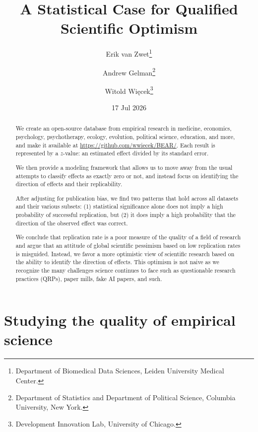 \documentclass[11pt]{article}
\begin{document}
\sloppy

\title{\bf A Statistical Case for Qualified Scientific Optimism\vspace{.1in}}

\author{
Erik van Zwet\thanks{Department of Biomedical Data Sciences, Leiden University Medical Center.}
\and Andrew Gelman\thanks{Department of Statistics and Department of Political Science, Columbia University, New York.}
\and Witold Wi\k{e}cek\thanks{Development Innovation Lab, University of Chicago.}
\vspace{.1in}
}

\date{17 Jul 2026}

\maketitle

\begin{abstract}

We create an open-source database from empirical research in medicine, economics, psychology, psychotherapy, ecology, evolution, political science, education, and more, and make it available at \url{https://github.com/wwiecek/BEAR/}. Each result is represented by a $z$-value: an estimated effect divided by its standard error.

We then provide a modeling framework that allows us to move away from the usual attempts to classify effects as exactly zero or not, and instead focus on identifying the direction of effects and their replicability. 

After adjusting for publication bias, we find two patterns that hold across all datasets and their various subsets: (1) statistical significance alone does not imply a high probability of successful replication, but (2) it does imply a high probability that the direction of the observed effect was correct. 

We conclude that replication rate is a poor measure of the quality of a field of research and argue that an attitude of global scientific pessimism based on low replication rates is misguided. Instead, we favor a more optimistic view of scientific research based on the ability to identify the direction of effects. This optimism is not naive as we recognize the many challenges science continues to face such as questionable research practices (QRPs), paper mills, fake AI papers, and such. 

\end{abstract}

\section{Studying the quality of empirical science}\label{introduction}
\end{document}
